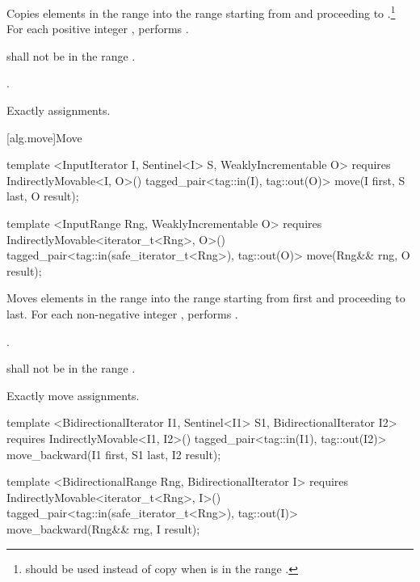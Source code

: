 \begin{itemdescr}
\pnum
\effects
Copies elements in the range 
into the
range 
starting from
and proceeding to .\footnote{
should be used instead of copy when 
is in
the range
.}
For each positive integer
,
performs
.

\pnum
\requires
{}
shall not be in the range
.

\pnum
\returns
{}.

\pnum
\complexity
Exactly
assignments.
\end{itemdescr}

[alg.move]{Move}

%
\begin{itemdecl}
template <InputIterator I, Sentinel<I> S, WeaklyIncrementable O>
  requires IndirectlyMovable<I, O>()
  tagged_pair<tag::in(I), tag::out(O)>
    move(I first, S last, O result);

template <InputRange Rng, WeaklyIncrementable O>
  requires IndirectlyMovable<iterator_t<Rng>, O>()
  tagged_pair<tag::in(safe_iterator_t<Rng>), tag::out(O)>
    move(Rng&& rng, O result);
\end{itemdecl}

\begin{itemdescr}
\pnum
\effects
Moves elements in the range 
into the range 
starting from first and proceeding to last.
For each non-negative integer
,
performs
 .

\pnum
\returns
{}.

\pnum
\requires
{}
shall not be in the range
.

\pnum
\complexity
Exactly
move assignments.
\end{itemdescr}

%
\begin{itemdecl}
template <BidirectionalIterator I1, Sentinel<I1> S1, BidirectionalIterator I2>
  requires IndirectlyMovable<I1, I2>()
  tagged_pair<tag::in(I1), tag::out(I2)>
    move_backward(I1 first, S1 last, I2 result);

template <BidirectionalRange Rng, BidirectionalIterator I>
  requires IndirectlyMovable<iterator_t<Rng>, I>()
  tagged_pair<tag::in(safe_iterator_t<Rng>), tag::out(I)>
    move_backward(Rng&& rng, I result);
\end{itemdecl}

